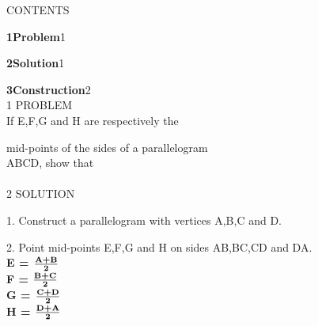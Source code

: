 \documentclass[a4paper,12pt]{report}
\begin{document}
\begin{multicols}{2}
\centering \large\textsc{C}\footnotesize\textsc{ONTENTS}\vspace{5mm}\\
\raggedright\large\textbf{1\hspace{1cm}Problem}\hspace{5.18cm}1\vspace{5mm}\\
\raggedright\large\textbf{2\hspace{1cm}Solution}\hspace{5.25cm}1\vspace{5mm}\\
\raggedright\large\textbf{3\hspace{1cm}Construction}\hspace{4.27cm}2\vspace{5mm}\\
\centering \large\textsc{1  P}\footnotesize\textsc{ROBLEM}\vspace{5mm}\\
\hspace{1cm}\large{If E,F,G and H are respectively the}\\ \raggedright{mid-points of the sides of a parallelogram \\ ABCD, show that}\\
\vspace{5mm}\\ 
\centering \large\textsc{2  S}\footnotesize\textsc{OLUTION}\vspace{5mm}\\
\raggedright\large{1. Construct a parallelogram with vertices A,B,C and D.}\vspace{2mm}\\
\raggedright\large{2. Point mid-points E,F,G and H on sides AB,BC,CD and DA.}\vspace{5mm}\\
\hspace{2cm}\textbf{E = $\frac{\textbf {A+B}}{\textbf 2}$}\vspace{2mm}\\
\hspace{2cm}\textbf{F = $\frac{\textbf {B+C}}{\textbf 2}$}\vspace{2mm}\\
\hspace{2cm}\textbf{G = $\frac{\textbf {C+D}}{\textbf 2}$}\vspace{2mm}\\
\hspace{2cm}\textbf{H = $\frac{\textbf {D+A}}{\textbf 2}$}\vspace{5mm}\\

\end{multicols}
\end{document}
